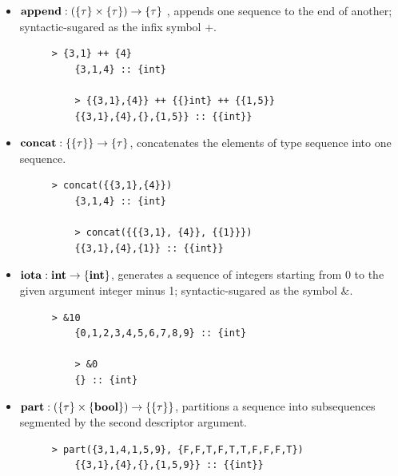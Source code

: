 \begin{itemize}

	\item $\mathbf{append : (\{\tau\} \times \{\tau\}) \rightarrow \{\tau\}}$ , 
	appends one sequence to the end of another; syntactic-sugared as the infix symbol {\++}.

	\begin{figure}[H]
	\begin{example}
	\end{example}
	\begin{lstlisting}[style = snesl-style]
	> {3,1} ++ {4}
	{3,1,4} :: {int}
	
	> {{3,1},{4}} ++ {{}int} ++ {{1,5}}
	{{3,1},{4},{},{1,5}} :: {{int}}
	\end{lstlisting}
	\end{figure}


	\item $\mathbf{concat: \{\{\tau\}\} \rightarrow \{\tau\} }$, concatenates the elements of type sequence into one sequence. 
	\begin{figure}[H]
	\begin{example}
	\end{example}
	\begin{lstlisting}[style = snesl-style]
	> concat({{3,1},{4}})
	{3,1,4} :: {int}
	
	> concat({{{3,1}, {4}}, {{1}}})
	{{3,1},{4},{1}} :: {{int}}
	\end{lstlisting}
	\end{figure}

	\item $\mathbf{iota: \mathbf{int} \rightarrow \{\mathbf{int}\}}$, generates a sequence of integers starting from 0 to the given argument integer minus 1; syntactic-sugared as the symbol \&. 
	\begin{figure}[H]
	\begin{example}
	\end{example}
	\begin{lstlisting}[style = snesl-style]
	> &10
	{0,1,2,3,4,5,6,7,8,9} :: {int}
	
	> &0
	{} :: {int}
	\end{lstlisting}
	\end{figure}
	
	\item $\mathbf{part: (\{\tau\} \times \{\mathbf{bool}\}) \rightarrow  \{\{\tau\}\}}$,  partitions a sequence into subsequences segmented by the second descriptor argument. 
	\begin{figure}[H]
	\begin{example}
	\end{example}
	\begin{lstlisting}[style = snesl-style]
	> part({3,1,4,1,5,9}, {F,F,T,F,T,T,F,F,F,T})
	{{3,1},{4},{},{1,5,9}} :: {{int}}
	

\end{lstlisting}
\end{figure}
\end{itemize}
